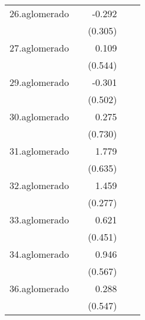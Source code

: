 {\begin{longtable}{l*{4}{D{.}{.}{-1}}}
\addlinespace
26.aglomerado&                     &      -0.292         &                     &                     \\
            &                     &     (0.305)         &                     &                     \\
\addlinespace
27.aglomerado&                     &       0.109         &                     &                     \\
            &                     &     (0.544)         &                     &                     \\
\addlinespace
29.aglomerado&                     &      -0.301         &                     &                     \\
            &                     &     (0.502)         &                     &                     \\
\addlinespace
30.aglomerado&                     &       0.275         &                     &                     \\
            &                     &     (0.730)         &                     &                     \\
\addlinespace
31.aglomerado&                     &       1.779\sym{**} &                     &                     \\
            &                     &     (0.635)         &                     &                     \\
\addlinespace
32.aglomerado&                     &       1.459\sym{***}&                     &                     \\
            &                     &     (0.277)         &                     &                     \\
\addlinespace
33.aglomerado&                     &       0.621         &                     &                     \\
            &                     &     (0.451)         &                     &                     \\
\addlinespace
34.aglomerado&                     &       0.946         &                     &                     \\
            &                     &     (0.567)         &                     &                     \\
\addlinespace
36.aglomerado&                     &       0.288         &                     &                     \\
            &                     &     (0.547)         &                     &                     \\

\end{longtable}}
